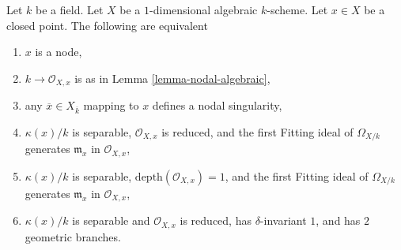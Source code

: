 \begin{lemma}
\label{lemma-nodal}
Let $k$ be a field. Let $X$ be a $1$-dimensional algebraic $k$-scheme.
Let $x \in X$ be a closed point. The following are equivalent
\begin{enumerate}
\item $x$ is a node,
\item $k \to \mathcal{O}_{X, x}$ is as in Lemma \ref{lemma-nodal-algebraic},
\item any $\overline{x} \in X_{\overline{k}}$ mapping to $x$ defines
a nodal singularity,
\item $\kappa(x)/k$ is separable, $\mathcal{O}_{X, x}$ is reduced, and
the first Fitting ideal of $\Omega_{X/k}$ generates $\mathfrak m_x$
in $\mathcal{O}_{X, x}$,
\item $\kappa(x)/k$ is separable, $\text{depth}(\mathcal{O}_{X, x}) = 1$, and
the first Fitting ideal of $\Omega_{X/k}$ generates $\mathfrak m_x$
in $\mathcal{O}_{X, x}$,
\item $\kappa(x)/k$ is separable and $\mathcal{O}_{X, x}$ is reduced, has
$\delta$-invariant $1$, and has $2$ geometric branches.
\end{enumerate}
\end{lemma}

